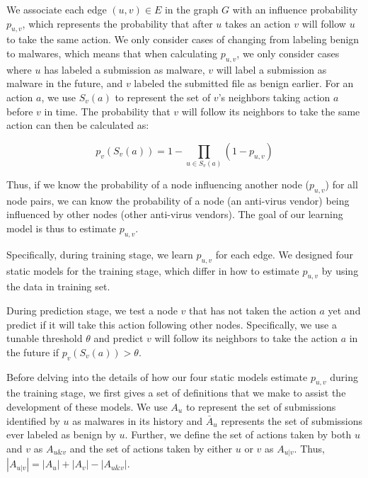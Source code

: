 We associate each edge $(u, v) \in E$ in the graph $G$ 
with an influence probability $p_{u,v}$,
which represents the probability that after $u$ takes an action $v$ will follow $u$ to take the same action.
We only consider cases of changing from labeling benign to malwares, 
which means that when calculating $p_{u,v}$, we only consider cases where $u$ has labeled a submission as malware, 
$v$ will label a submission as malware in the future, 
and $v$ labeled the submitted file as benign earlier. 
For an action $a$, we use $S_v(a)$ to represent the set of $v$'s neighbors taking action $a$ before $v$ in time. 
The probability that $v$ will follow its neighbors to take the same action can then be calculated as:

\begin{equation} \label{eq:setp}
p_v(S_v(a)) = 1 - \prod\limits_{u \in S_v(a)}(1 - p_{u,v})
\end{equation}

Thus, if we know the probability of a node influencing another node ($p_{u,v}$) for all node pairs,
we can know the probability of a node (an anti-virus vendor) being influenced by other nodes (other anti-virus vendors).
The goal of our learning model is thus to estimate $p_{u,v}$.

Specifically, during training stage, we learn $p_{u,v}$ for each edge. 
We designed four static models for the training stage, which differ in how to estimate $p_{u,v}$ by using the data in training set. 

During prediction stage, we test a node $v$ that has not taken the action $a$ yet
and predict if it will take this action following other nodes. 
Specifically, we use a tunable threshold $\theta$
and predict $v$ will follow its neighbors to take the action $a$ in the future
if $p_v(S_v(a))>\theta$.

Before delving into the details of how our four static models estimate $p_{u,v}$ during the training stage, 
we first gives a set of definitions that we make to assist the development of these models.
We use $A_u$ to represent the set of submissions identified by $u$ as malwares in its history
and $\bar{A}_u$ represents the set of submissions ever labeled as benign by $u$.
Further, we define the set of actions taken by both $u$ and $v$ as $A_{u\&v}$ 
and the set of actions taken by either $u$ or $v$ as $A_{u|v}$.
Thus, $|A_{u|v}| =   |A_u| + |A_v| - |A_{u\&v}|$.

